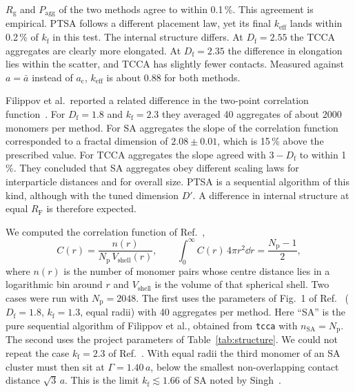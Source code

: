 \documentclass[11pt,a4paper]{article}
\newcommand{\abar}{\bar{a}}
\newcommand{\Df}{D_\text{f}}
\newcommand{\kf}{k_\text{f}}
\newcommand{\RF}{R_\text{F}}
\newcommand{\Rg}{R_\text{g}}
\newcommand{\nSA}{n_\text{SA}}
\begin{document}
$\Rg$ and $P_\text{agg}$ of the two methods agree to within 0.1\,\%.
This agreement is empirical.
PTSA follows a different placement law, yet its final $k_\text{eff}$ lands within 0.2\,\% of $\kf$ in this test.
The internal structure differs.
At $\Df = 2.55$ the TCCA aggregates are clearly more elongated.
At $\Df = 2.35$ the difference in elongation lies within the scatter, and TCCA has slightly fewer contacts.
Measured against $a = \abar$ instead of $a_\text{c}$, $k_\text{eff}$ is about 0.88 for both methods.

Filippov et al.\ reported a related difference in the two-point correlation function~\cite{filippov2000}.
For $\Df = 1.8$ and $\kf = 2.3$ they averaged 40 aggregates of about 2000 monomers per method.
For SA aggregates the slope of the correlation function corresponded to a fractal dimension of $2.08 \pm 0.01$, which is 15\,\% above the prescribed value.
For TCCA aggregates the slope agreed with $3 - \Df$ to within 1\,\%.
They concluded that SA aggregates obey different scaling laws for interparticle distances and for overall size.
PTSA is a sequential algorithm of this kind, although with the tuned dimension $D'$.
A difference in internal structure at equal $\RF$ is therefore expected.

We computed the correlation function of Ref.~\cite{filippov2000},
\begin{equation}
  C(r) = \frac{n(r)}{N_\text{p}\,V_\text{shell}(r)}, \qquad
  \int_0^\infty C(r)\,4\pi r^2 \dd{r} = \frac{N_\text{p} - 1}{2} ,
  \label{eq:correlation}
\end{equation}
where $n(r)$ is the number of monomer pairs whose centre distance lies in a logarithmic bin around $r$ and $V_\text{shell}$ is the volume of that spherical shell.
Two cases were run with $N_\text{p} = 2048$.
The first uses the parameters of Fig.~1 of Ref.~\cite{filippov2000} ($\Df = 1.8$, $\kf = 1.3$, equal radii) with 40 aggregates per method.
Here ``SA'' is the pure sequential algorithm of Filippov et al., obtained from \texttt{tcca} with $\nSA = N_\text{p}$.
The second uses the project parameters of Table~\ref{tab:structure}.
We could not repeat the case $\kf = 2.3$ of Ref.~\cite{filippov2000}.
With equal radii the third monomer of an SA cluster must then sit at $\Gamma = 1.40\,a$, below the smallest non-overlapping contact distance $\sqrt{3}\,a$.
This is the limit $\kf \lesssim 1.66$ of SA noted by Singh~\cite{singh2021thesis}.
\end{document}
